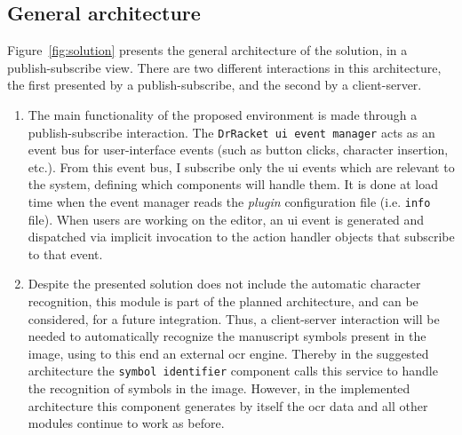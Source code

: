 \subsection{General architecture}

Figure~\ref{fig:solution} presents the general architecture of the solution, in a publish-subscribe view. There are two different interactions in this architecture, the first presented by a publish-subscribe, and the second by a client-server.

\begin{enumerate}
    \item The main functionality of the proposed environment is made through a publish-subscribe interaction. The \texttt{DrRacket \gls{ui} event manager} acts as an event bus for user-interface events (such as button clicks, character insertion, etc.). From this event bus, I subscribe only the \gls{ui} events which are relevant to the system, defining which components will handle them. It is done at load time when the event manager reads the \textit{\textit{plugin}} configuration file (i.e. \texttt{info} file). When users are working on the editor, an \gls{ui} event is generated and dispatched via implicit invocation to the action handler objects that subscribe to that event.

    \item Despite the presented solution does not include the automatic character recognition, this module is part of the planned architecture, and can be considered, for a future integration. Thus, a client-server interaction will be needed to automatically recognize the manuscript symbols present in the image, using to this end an external \gls{ocr} engine. Thereby in the suggested architecture the \texttt{symbol identifier} component calls this service to handle the recognition of symbols in the image. However, in the implemented architecture this component generates by itself the \gls{ocr} data and all other modules continue to work as before.  
\end{enumerate}

